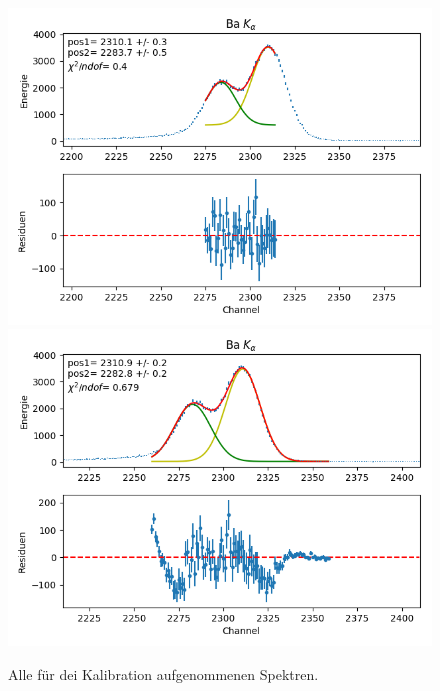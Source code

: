 \documentclass[12pt,a4paper]{article}
\begin{document}
\begin{figure}[H]
\centering
\includegraphics[scale=0.8]{Bilder/alpha/ba_alpha_1.png}
\includegraphics[scale=0.8]{Bilder/alpha/ba_alpha_2.png}
\caption{Alle für dei Kalibration aufgenommenen Spektren.}
\label{fig:kal_alles}
\end{figure}
\end{document}

